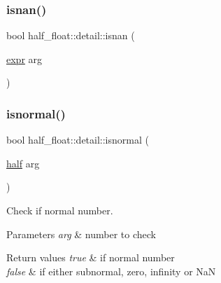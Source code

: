 \subsubsection{\texorpdfstring{isnan()}{isnan()}\hspace{0.1cm}{\footnotesize\ttfamily [2/2]}}
{\footnotesize\ttfamily bool half\+\_\+float\+::detail\+::isnan (\begin{DoxyParamCaption}\item[{\hyperlink{structhalf__float_1_1detail_1_1expr}{expr}}]{arg }\end{DoxyParamCaption})\hspace{0.3cm}{\ttfamily [inline]}}

\mbox{\label{namespacehalf__float_1_1detail_a8cb72b0b732c9ad285220edbf2cdf303}} 
\subsubsection{\texorpdfstring{isnormal()}{isnormal()}\hspace{0.1cm}{\footnotesize\ttfamily [1/2]}}
{\footnotesize\ttfamily bool half\+\_\+float\+::detail\+::isnormal (\begin{DoxyParamCaption}\item[{\hyperlink{classhalf__float_1_1half}{half}}]{arg }\end{DoxyParamCaption})\hspace{0.3cm}{\ttfamily [inline]}}

Check if normal number. 
\begin{DoxyParams}{Parameters}
{\em arg} & number to check \\
\hline
\end{DoxyParams}

\begin{DoxyRetVals}{Return values}
{\em true} & if normal number \\
\hline
{\em false} & if either subnormal, zero, infinity or NaN \\
\hline
\end{DoxyRetVals}
\mbox{\label{namespacehalf__float_1_1detail_aa68c8d309a1adebe2de30c3ea5c9c577}} 
